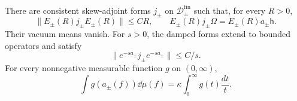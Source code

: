 \begin{lemma}\label{lem:chiral-forms}
There are consistent skew-adjoint forms $j_\pm$ on
$\mathcal D_\pm^{\mathrm{fin}}$ such that, for every $R>0$,
\begin{equation}\label{eq:chiral-form-bound}
 \|E_\pm(R)j_\pm E_\pm(R)\|\le CR,
 \qquad E_\pm(R)j_\pm\Omega=E_\pm(R)a_\pm\mathsf h.
\end{equation}
Their vacuum means vanish. For $s>0$, the damped forms extend to bounded
operators and satisfy
\begin{equation}\label{eq:chiral-damped-form}
                     \|e^{-sa_\pm}j_\pm e^{-sa_\pm}\|\le C/s.
\end{equation}
For every nonnegative measurable function $g$ on $(0,\infty)$,
\begin{equation}\label{eq:chiral-Haar-integral}
             \int g(a_\pm(f))\dd\mu(f)
                     =\kappa\int_0^\infty g(t)\frac{dt}{t}.
\end{equation}
\end{lemma}

